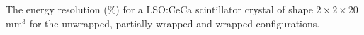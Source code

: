 \label{fig:energyresolution-20} The energy resolution ($\%$) for a LSO:CeCa scintillator crystal of shape $2\times2\times20$mm$^3$ for the unwrapped, partially wrapped and wrapped configurations.